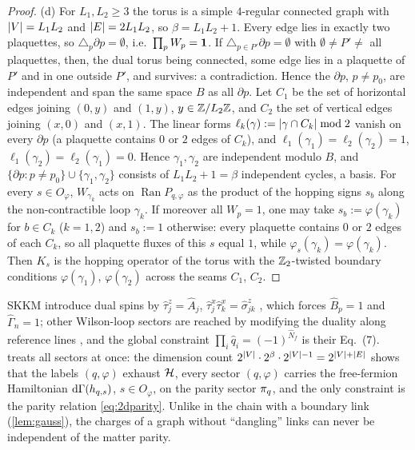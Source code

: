 \begin{proof}
(d) For $L_1,L_2\ge3$ the torus is a simple $4$-regular connected graph with $\left|V\right|=L_1L_2$ and $\left|E\right|=2L_1L_2$,
so $\beta=L_1L_2+1$.  Every edge lies in exactly two plaquettes, so $\triangle_p\partial p=\emptyset$, i.e.\
$\prod_pW_p=\mathbf{1}$.  If $\triangle_{p\in P'}\partial p=\emptyset$ with $\emptyset\neq P'\neq$ all plaquettes, then,
the dual torus being connected, some edge lies in a plaquette of $P'$ and in one outside $P'$, and survives:
a contradiction.  Hence the $\partial p$, $p\ne p_0$, are independent and span the same space $B$ as all
$\partial p$.  Let $C_1$ be the set of horizontal edges joining $(0,y)$ and $(1,y)$, $y\in\mathbb{Z}/L_2\mathbb{Z}$, and $C_2$
the set of vertical edges joining $(x,0)$ and $(x,1)$.  The linear forms $\ell_k(\gamma):=\left|\gamma\cap C_k\right|\bmod2$
vanish on every $\partial p$ (a plaquette contains $0$ or $2$ edges of $C_k$), and
$\ell_1(\gamma_1)=\ell_2(\gamma_2)=1$, $\ell_1(\gamma_2)=\ell_2(\gamma_1)=0$.  Hence $\gamma_1,\gamma_2$ are independent
modulo $B$, and $\{\partial p:p\ne p_0\}\cup\{\gamma_1,\gamma_2\}$ consists of $L_1L_2+1=\beta$ independent cycles, a
basis.  For every $s\in O_\varphi$, $W_{\gamma_k}$ acts on $\operatorname{Ran}P_{q,\varphi}$ as the product of the hopping
signs $s_b$ along the non-contractible loop $\gamma_k$.  If moreover all $W_p=1$, one may take $s_b:=\varphi(\gamma_k)$ for
$b\in C_k$ ($k=1,2$) and $s_b:=1$ otherwise: every plaquette contains $0$ or $2$ edges of each $C_k$, so all plaquette
fluxes of this $s$ equal $1$, while $\varphi_s(\gamma_k)=\varphi(\gamma_k)$.  Then $K_s$ is the hopping operator of the torus
with the $\mathbb{Z}_2$-twisted boundary conditions $\varphi(\gamma_1)$, $\varphi(\gamma_2)$ across the seams $C_1$, $C_2$.
\end{proof}

\begin{remark}\label{rem:2dSKKM}
SKKM introduce dual spins by $\hat\tau^z_j=\hat A_j$, $\hat\tau^x_j\hat\tau^x_k=\hat\sigma^z_{jk}$
\cite[Eq.~(5)]{SKKM2018}, which forces $\hat B_p=1$ and $\hat\Gamma_n=1$; other Wilson-loop sectors are reached by
modifying the duality along reference lines \cite[Eq.~(19)]{SKKM2018}, and the global constraint
$\prod_i\hat q_i=(-1)^{\hat N_f}$ is their Eq.~(7).  \Cref{thm:2dmap} treats all sectors at once: the dimension
count $2^{\left|V\right|}\cdot2^\beta\cdot2^{\left|V\right|-1}=2^{\left|V\right|+\left|E\right|}$ shows that the labels $(q,\varphi)$ exhaust
$\mathcal{H}$, every sector $(q,\varphi)$ carries the free-fermion Hamiltonian $\mathrm{d}\Gamma(h_{q,s})$, $s\in O_\varphi$, on the
parity sector $\pi_q$, and the only constraint is the parity relation \eqref{eq:2dparity}.  Unlike in the chain with a boundary link
(\cref{lem:gauss}), the charges of a graph without ``dangling'' links can never be independent of the matter
parity.
\end{remark}

